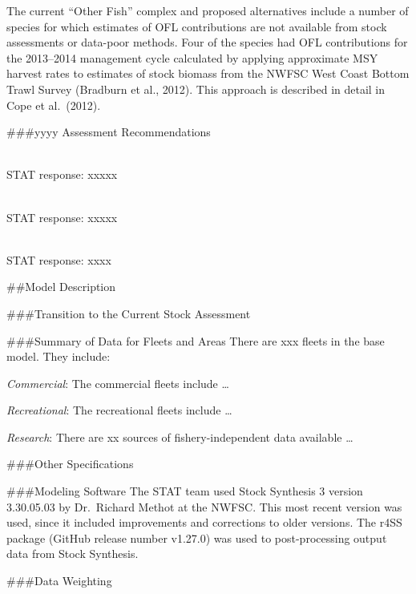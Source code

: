 \documentclass[12pt,]{article}
\begin{document}
The current ``Other Fish'' complex and proposed alternatives include a
number of species for which estimates of OFL contributions are not
available from stock assessments or data-poor methods. Four of the
species had OFL contributions for the 2013--2014 management cycle
calculated by applying approximate MSY harvest rates to estimates of
stock biomass from the NWFSC West Coast Bottom Trawl Survey (Bradburn et
al., 2012). This approach is described in detail in Cope et al.~(2012).

\#\#\#yyyy Assessment Recommendations

\begin{description}[style=unboxed]

  \item[Recommendation 1: ] \hfill \\

   STAT response: xxxxx

\item[Recommendation 2: ] \hfill \\

  STAT response: xxxxx

\item[Recommendation 3: ] \hfill \\

  STAT response: xxxx

  
\end{description}

\#\#Model Description

\#\#\#Transition to the Current Stock Assessment

\#\#\#Summary of Data for Fleets and Areas There are xxx fleets in the
base model. They include:

\emph{Commercial}: The commercial fleets include \ldots{}

\emph{Recreational}: The recreational fleets include \ldots{}

\emph{Research}: There are xx sources of fishery-independent data
available \ldots{}

\#\#\#Other Specifications

\#\#\#Modeling Software The STAT team used Stock Synthesis 3 version
3.30.05.03 by Dr.~Richard Methot at the NWFSC. This most recent version
was used, since it included improvements and corrections to older
versions. The r4SS package (GitHub release number v1.27.0) was used to
post-processing output data from Stock Synthesis.

\#\#\#Data Weighting
\end{document}

